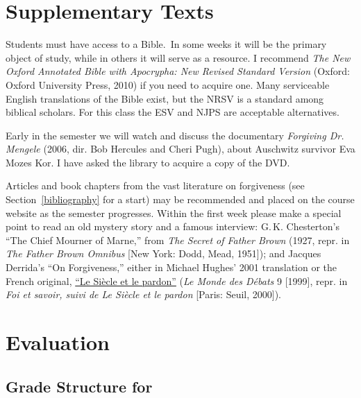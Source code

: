 \documentclass[titlepage]{article}
\begin{document}
\section{Supplementary Texts}
\label{supplementary}

Students must have access to a Bible. In some weeks it will be the
primary object of study, while in others it will serve as a resource. I
recommend \emph{The New Oxford Annotated Bible with Apocrypha: New
Revised Standard Version} (Oxford: Oxford University Press, 2010) if you
need to acquire one. Many serviceable English translations of the Bible
exist, but the NRSV is a standard among biblical scholars. For this
class the ESV and NJPS are acceptable alternatives.

Early in the semester we will watch and discuss the documentary
\emph{Forgiving Dr. Mengele} (2006, dir. Bob Hercules and Cheri Pugh),
about Auschwitz survivor Eva Mozes Kor. I have asked the library to
acquire a copy of the DVD.

Articles and book chapters from the vast literature on forgiveness (see
Section~\ref{bibliography} for a start) may be recommended and placed on
the course website as the semester progresses. Within the first week
please make a special point to read an old mystery story and a famous
interview: G.\,K. Chesterton's ``The Chief Mourner of Marne,'' from
\emph{The Secret of Father Brown} (1927, repr. in \emph{The Father Brown
Omnibus} [New York: Dodd, Mead, 1951]); and Jacques Derrida's ``On
Forgiveness,'' either in Michael Hughes' 2001 translation \cite{Der01}
or the French original,
\href{http://hydra.humanities.uci.edu/derrida/siecle.html}{``Le Siècle
et le pardon''} (\emph{Le Monde des Débats} 9 [1999], repr. in \emph{Foi
et savoir, suivi de Le Siècle et le pardon} [Paris: Seuil, 2000]).


\section{Evaluation}
\label{evaluation}

\subsection{Grade Structure for \ccode}
\label{structure}
\end{document}
